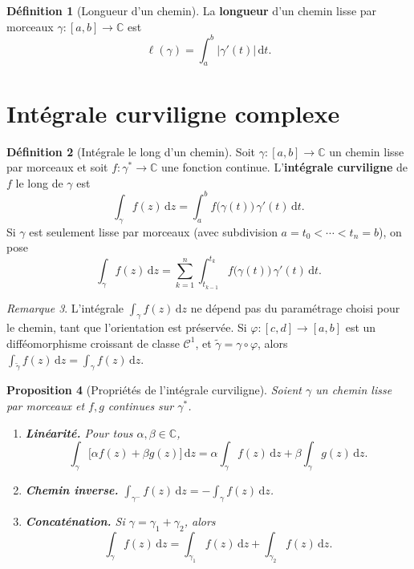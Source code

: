 \documentclass[12pt,a4paper,openany]{book}
\theoremstyle{definition}
\newtheorem{definition}{Définition}[chapter]
\theoremstyle{plain}
\newtheorem{proposition}[definition]{Proposition}
\theoremstyle{remark}
\newtheorem{remarque}[definition]{Remarque}
\newcommand{\C}{\mathbb{C}}
\newcommand{\dd}{\mathrm{d}}
\newcommand{\abs}[1]{\left|#1\right|}
\begin{document}
\begin{definition}[Longueur d'un chemin]\label{def:longueur-chemin}
La \textbf{longueur} d'un chemin lisse par morceaux
$\gamma \colon [a,b] \to \C$ est
\[
  \ell(\gamma) = \int_a^b \abs{\gamma'(t)} \, \dd t.
\]
\end{definition}

\section{Intégrale curviligne complexe}\label{sec:integrale-curviligne}

\begin{definition}[Intégrale le long d'un chemin]\label{def:integrale-curviligne}
Soit $\gamma \colon [a,b] \to \C$ un chemin lisse par morceaux et soit
$f \colon \gamma^* \to \C$ une fonction continue. L'\textbf{intégrale
curviligne} de $f$ le long de $\gamma$ est
\[
  \int_\gamma f(z) \, \dd z
  = \int_a^b f\bigl(\gamma(t)\bigr) \, \gamma'(t) \, \dd t.
\]
Si $\gamma$ est seulement lisse par morceaux (avec subdivision
$a = t_0 < \cdots < t_n = b$), on pose
\[
  \int_\gamma f(z) \, \dd z
  = \sum_{k=1}^{n} \int_{t_{k-1}}^{t_k}
    f\bigl(\gamma(t)\bigr) \, \gamma'(t) \, \dd t.
\]
\end{definition}

\begin{remarque}\label{rem:integrale-reparametrage}
L'intégrale $\int_\gamma f(z)\,\dd z$ ne dépend pas du paramétrage choisi
pour le chemin, tant que l'orientation est préservée. Si $\varphi \colon
[c,d] \to [a,b]$ est un difféomorphisme croissant de classe $\mathcal{C}^1$,
et $\tilde{\gamma} = \gamma \circ \varphi$, alors
$\int_{\tilde{\gamma}} f(z)\,\dd z = \int_\gamma f(z)\,\dd z$.
\end{remarque}

\begin{proposition}[Propriétés de l'intégrale curviligne]\label{prop:proprietes-integrale}
Soient $\gamma$ un chemin lisse par morceaux et $f, g$ continues sur $\gamma^*$.
\begin{enumerate}[label=\textup{(\roman*)}]
  \item \textbf{Linéarité.} Pour tous $\alpha, \beta \in \C$,
    \[
      \int_\gamma \bigl[\alpha f(z) + \beta g(z)\bigr] \, \dd z
      = \alpha \int_\gamma f(z)\,\dd z + \beta \int_\gamma g(z)\,\dd z.
    \]
  \item \textbf{Chemin inverse.}
    $\displaystyle \int_{\gamma^-} f(z)\,\dd z = -\int_\gamma f(z)\,\dd z$.
  \item \textbf{Concaténation.} Si $\gamma = \gamma_1 + \gamma_2$, alors
    \[
      \int_\gamma f(z)\,\dd z
      = \int_{\gamma_1} f(z)\,\dd z + \int_{\gamma_2} f(z)\,\dd z.
    \]
\end{enumerate}
\end{proposition}
\end{document}
